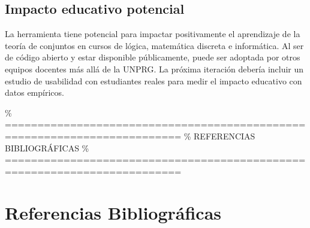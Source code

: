 \documentclass[11pt,a4paper]{article}
\begin{document}
\subsection{Impacto educativo potencial}
La herramienta tiene potencial para impactar positivamente el aprendizaje de la teoría de conjuntos en cursos de lógica, matemática discreta e informática. Al ser de código abierto y estar disponible públicamente, puede ser adoptada por otros equipos docentes más allá de la UNPRG. La próxima iteración debería incluir un estudio de usabilidad con estudiantes reales para medir el impacto educativo con datos empíricos.

\newpage

\% =========================================================================
\% REFERENCIAS BIBLIOGRÁFICAS
\% =========================================================================
\section*{Referencias Bibliográficas}
\end{document}
